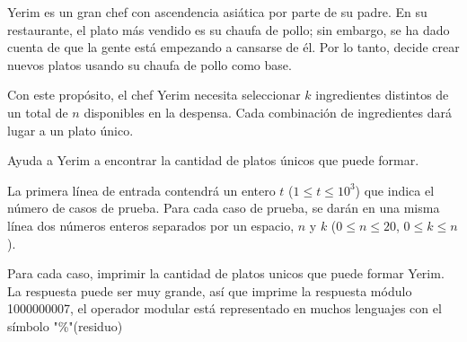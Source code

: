 
Yerim es un gran chef con ascendencia asiática por parte de su padre. En su restaurante, el plato más vendido es su chaufa de pollo; sin embargo, se ha dado cuenta de que la gente está empezando a cansarse de él. Por lo tanto, decide crear nuevos platos usando su chaufa de pollo como base.

Con este propósito, el chef Yerim necesita seleccionar $k$ ingredientes distintos de un total de $n$ disponibles en la despensa. Cada combinación de ingredientes dará lugar a un plato único.


Ayuda a Yerim a encontrar la cantidad de platos únicos que puede formar.



La primera línea de entrada contendrá un entero $t$ ($1\leq t \leq 10^3$) que indica el número de casos de prueba. Para cada caso de prueba, se darán en una misma línea dos números enteros separados por un espacio, $n$ y $k$ ($0 \leq n \leq 20$, $0 \leq k \leq n$).

\outputText

Para cada caso, imprimir la cantidad de platos unicos que puede formar Yerim.\\
La respuesta puede ser muy grande, así que imprime la respuesta módulo 1000000007, el operador modular está representado en muchos lenguajes con el símbolo "\%"(residuo)

\exampleCases

\begin{example}
\end{example}


